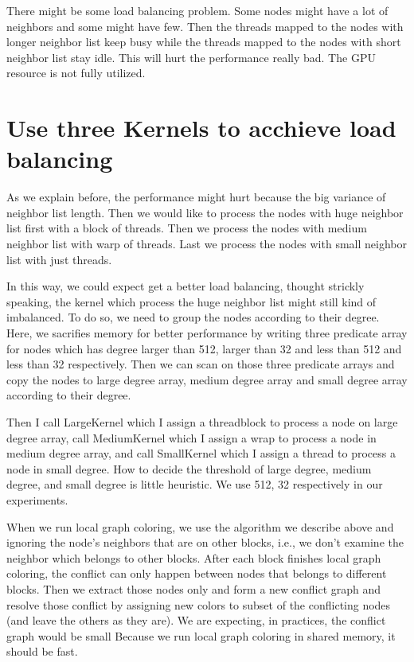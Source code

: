 \documentclass[12pt] {article}
\begin{document}
There might be some load balancing problem. Some nodes might have a lot of neighbors and some might have few. Then the threads mapped to the nodes with longer neighbor
list keep busy while the threads mapped to the nodes with short neighbor list stay idle. This will hurt the performance really bad. The GPU resource is not fully
utilized.

\section*{Use three Kernels to acchieve load balancing}
As we explain before, the performance might hurt because the big variance of neighbor list length. Then we would like to process the nodes with huge neighbor list first
with a block of threads. Then we process the nodes with medium neighbor list with warp of threads. Last we process the nodes with small neighbor list with just threads.

In this way, we could expect get a better load balancing, thought strickly speaking, the kernel which process the huge neighbor list might still kind of imbalanced. To
do so, we need to group the nodes according to their degree. Here, we sacrifies memory for better performance by writing three predicate array for nodes which has
degree larger than 512, larger than 32 and less than 512 and less than 32 respectively. Then we can scan on those three predicate arrays and copy the nodes to large
degree array, medium degree array and small degree array according to their degree.

Then I call LargeKernel which I assign a threadblock to process a node on large degree array, call MediumKernel which I assign a wrap to process a node in medium degree
array, and call SmallKernel which I assign a thread to process a node in small degree. How to decide the threshold of large degree, medium degree, and small degree is
little heuristic. We use 512, 32 respectively in our experiments.

When we run local graph coloring, we use the algorithm we describe above and ignoring the node's neighbors that are on other blocks, i.e., we don't examine the neighbor which belongs to other blocks. After each block finishes local graph coloring, the conflict can only happen between nodes that belongs to different blocks. Then we extract those nodes only and form a new conflict graph and resolve those conflict by assigning new colors to subset of the conflicting nodes (and leave the others as they are). We are expecting, in practices, the conflict graph would be small %
Because we run local graph coloring in shared memory, it should be fast. 
\end{document}
